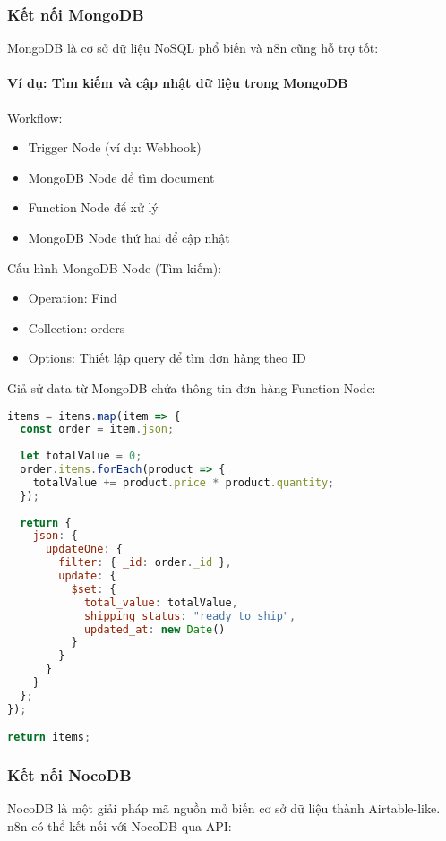 \subsubsection{Kết nối MongoDB}

MongoDB là cơ sở dữ liệu NoSQL phổ biến và n8n cũng hỗ trợ tốt:

\paragraph{Ví dụ: Tìm kiếm và cập nhật dữ liệu trong MongoDB}

Workflow:
\begin{itemize}
    \item Trigger Node (ví dụ: Webhook)
    \item MongoDB Node để tìm document
    \item Function Node để xử lý
    \item MongoDB Node thứ hai để cập nhật
\end{itemize}

Cấu hình MongoDB Node (Tìm kiếm):
\begin{itemize}
    \item Operation: Find
    \item Collection: orders
    \item Options: Thiết lập query để tìm đơn hàng theo ID
\end{itemize}
Giả sử data từ MongoDB chứa thông tin đơn hàng
Function Node:
\begin{lstlisting}[language=JavaScript]
items = items.map(item => {
  const order = item.json;
  
  let totalValue = 0;
  order.items.forEach(product => {
    totalValue += product.price * product.quantity;
  });
  
  return {
    json: {
      updateOne: {
        filter: { _id: order._id },
        update: {
          $set: {
            total_value: totalValue,
            shipping_status: "ready_to_ship",
            updated_at: new Date()
          }
        }
      }
    }
  };
});

return items;
\end{lstlisting}

\subsubsection{Kết nối NocoDB}

NocoDB là một giải pháp mã nguồn mở biến cơ sở dữ liệu thành Airtable-like. n8n có thể kết nối với NocoDB qua API:

